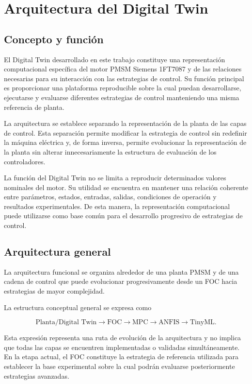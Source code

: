 \section{Arquitectura del Digital Twin}

\subsection{Concepto y función}

El Digital Twin desarrollado en este trabajo constituye una representación computacional específica del motor PMSM Siemens 1FT7087 y de las relaciones necesarias para su interacción con las estrategias de control. Su función principal es proporcionar una plataforma reproducible sobre la cual puedan desarrollarse, ejecutar­se y evaluarse diferentes estrategias de control manteniendo una misma referencia de planta.

La arquitectura se establece separando la representación de la planta de las capas de control. Esta separación permite modificar la estrategia de control sin redefinir la máquina eléctrica y, de forma inversa, permite evolucionar la representación de la planta sin alterar innecesariamente la estructura de evaluación de los controladores.

La función del Digital Twin no se limita a reproducir determinados valores nominales del motor. Su utilidad se encuentra en mantener una relación coherente entre parámetros, estados, entradas, salidas, condiciones de operación y resultados experimentales. De esta manera, la representación computacional puede utilizarse como base común para el desarrollo progresivo de estrategias de control.

\subsection{Arquitectura general}

La arquitectura funcional se organiza alrededor de una planta PMSM y de una cadena de control que puede evolucionar progresivamente desde un FOC hacia estrategias de mayor complejidad.

La estructura conceptual general se expresa como

\begin{equation}
\text{Planta/Digital Twin}
\rightarrow
\text{FOC}
\rightarrow
\text{MPC}
\rightarrow
\text{ANFIS}
\rightarrow
\text{TinyML}.
\end{equation}

Esta expresión representa una ruta de evolución de la arquitectura y no implica que todas las capas se encuentren implementadas o validadas simultáneamente. En la etapa actual, el FOC constituye la estrategia de referencia utilizada para establecer la base experimental sobre la cual podrán evaluarse posteriormente estrategias avanzadas.

